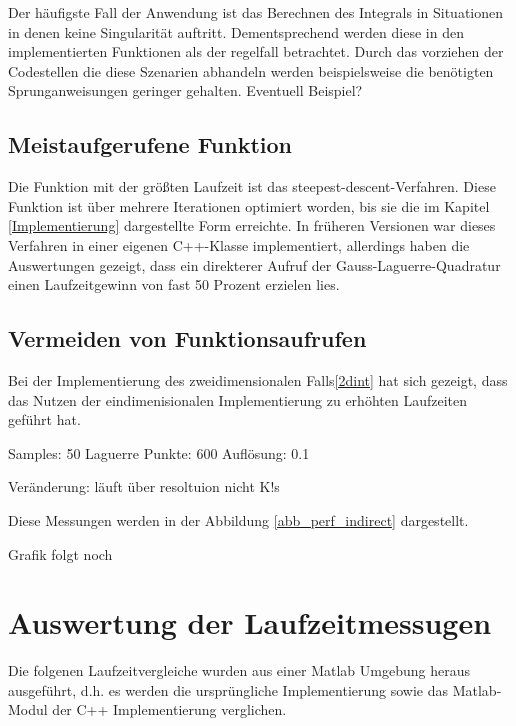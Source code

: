 Der häufigste Fall der Anwendung ist das Berechnen des Integrals in Situationen in denen keine Singularität auftritt. 
Dementsprechend werden diese in den implementierten Funktionen als der regelfall betrachtet.
Durch das vorziehen der Codestellen die diese Szenarien abhandeln werden beispielsweise die benötigten Sprunganweisungen geringer gehalten.
Eventuell Beispiel?



\subsection{Meistaufgerufene Funktion}
Die Funktion mit der größten Laufzeit ist das steepest-descent-Verfahren.
Diese Funktion ist über mehrere Iterationen optimiert worden, bis sie die im Kapitel \ref{Implementierung} dargestellte Form erreichte.
In früheren Versionen war dieses Verfahren in einer eigenen C++-Klasse implementiert, allerdings haben die Auswertungen gezeigt, dass ein
direkterer Aufruf der Gauss-Laguerre-Quadratur einen Laufzeitgewinn von fast 50 Prozent erzielen lies.

\subsection{Vermeiden von Funktionsaufrufen}

Bei der Implementierung des zweidimensionalen Falls\ref{2dint} hat sich gezeigt, dass das Nutzen der eindimenisionalen Implementierung zu erhöhten Laufzeiten geführt hat.

Samples: 50
Laguerre Punkte: 600
Auflösung: 0.1

Veränderung: läuft über resoltuion nicht K!s

Diese Messungen werden in der Abbildung \ref{abb_perf_indirect} dargestellt.

\begin{center}
  
\end{center}

Grafik folgt noch

\section{Auswertung der Laufzeitmessugen}

Die folgenen Laufzeitvergleiche wurden aus einer Matlab Umgebung heraus ausgeführt, d.h. es werden die ursprüngliche Implementierung sowie das Matlab-Modul der C++ Implementierung verglichen.


